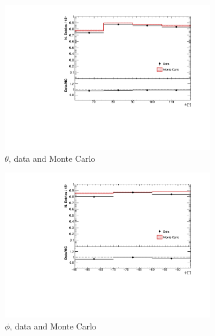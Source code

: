 \documentclass[a4paper]{scrartcl}
\begin{document}
\begin{figure}[htbp]
\begin{center}
\begin{subfigure}{0.52\textwidth}
\includegraphics[width=\linewidth]{figures/theta_cry.pdf}
\caption{$\theta$, data and Monte Carlo} \label{fig:1d_cry}
\end{subfigure}\begin{subfigure}{0.52\textwidth}
\includegraphics[width=\linewidth]{figures/phi_cry.pdf}
\caption{$\phi$, data and Monte Carlo}\label{fig:1d_cry_mc}
\end{subfigure}
\begin{subfigure}{0.52\textwidth}

\end{subfigure}
\end{center}
\end{figure}
\end{document}
